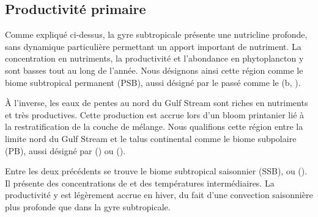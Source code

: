 \subsection{Productivité primaire}
\label{sec:gs-biologie}

Comme expliqué ci-dessus, la gyre subtropicale présente une nutricline profonde, sans dynamique particulière permettant un apport important de nutriment.
La concentration en nutriments, la productivité et l'abondance en phytoplancton y sont basses tout au long de l'année.
Nous désignons ainsi cette région comme le biome subtropical permanent (PSB), aussi désigné par le passé comme le  (b, \cite{sarmiento_2004}).

À l'inverse, les eaux de pentes au nord du Gulf Stream sont riches en nutriments et très productives.
Cette production est accrue lors d'un bloom printanier lié à la restratification de la couche de mélange.
Nous qualifions cette région entre la limite nord du Gulf Stream et le talus continental comme le biome subpolaire (PB), aussi désigné par  (\cite{sarmiento_2004}) ou  (\cite{bock_2022}).

Entre les deux précédents se trouve le biome subtropical saisonnier (SSB), ou  (\cite{sarmiento_2004}).
Il présente des concentrations de  et des températures intermédiaires.
La productivité y est légèrement accrue en hiver, du fait d'une convection saisonnière plus profonde que dans la gyre subtropicale.

